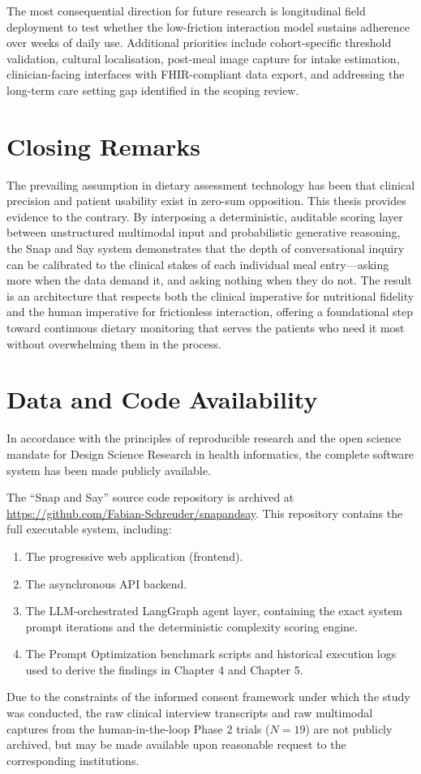 The most consequential direction for future research is longitudinal field deployment to test whether the low-friction interaction model sustains adherence over weeks of daily use. Additional priorities include cohort-specific threshold validation, cultural localisation, post-meal image capture for intake estimation, clinician-facing interfaces with FHIR-compliant data export, and addressing the long-term care setting gap identified in the scoping review.

\section{Closing Remarks}

The prevailing assumption in dietary assessment technology has been that clinical precision and patient usability exist in zero-sum opposition. This thesis provides evidence to the contrary. By interposing a deterministic, auditable scoring layer between unstructured multimodal input and probabilistic generative reasoning, the Snap and Say system demonstrates that the depth of conversational inquiry can be calibrated to the clinical stakes of each individual meal entry---asking more when the data demand it, and asking nothing when they do not. The result is an architecture that respects both the clinical imperative for nutritional fidelity and the human imperative for frictionless interaction, offering a foundational step toward continuous dietary monitoring that serves the patients who need it most without overwhelming them in the process.

\section{Data and Code Availability}

In accordance with the principles of reproducible research and the open science mandate for Design Science Research in health informatics, the complete software system has been made publicly available.

The ``Snap and Say'' source code repository is archived at \url{https://github.com/Fabian-Schreuder/snapandsay}. This repository contains the full executable system, including:
\begin{enumerate}
    \item The progressive web application (frontend).
    \item The asynchronous API backend.
    \item The LLM-orchestrated LangGraph agent layer, containing the exact system prompt iterations and the deterministic complexity scoring engine.
    \item The Prompt Optimization benchmark scripts and historical execution logs used to derive the findings in Chapter 4 and Chapter 5.
\end{enumerate}

Due to the constraints of the informed consent framework under which the study was conducted, the raw clinical interview transcripts and raw multimodal captures from the human-in-the-loop Phase 2 trials ($N=19$) are not publicly archived, but may be made available upon reasonable request to the corresponding institutions.

